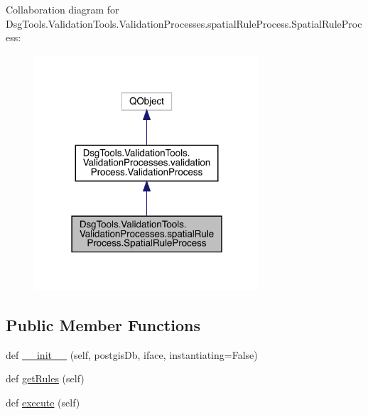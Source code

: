 Collaboration diagram for Dsg\+Tools.\+Validation\+Tools.\+Validation\+Processes.\+spatial\+Rule\+Process.\+Spatial\+Rule\+Process\+:
\nopagebreak
\begin{figure}[H]
\begin{center}
\leavevmode
\includegraphics[width=238pt]{class_dsg_tools_1_1_validation_tools_1_1_validation_processes_1_1spatial_rule_process_1_1_spatial_rule_process__coll__graph}
\end{center}
\end{figure}
\subsection*{Public Member Functions}
\begin{DoxyCompactItemize}
\item 
def \mbox{\hyperlink{class_dsg_tools_1_1_validation_tools_1_1_validation_processes_1_1spatial_rule_process_1_1_spatial_rule_process_a72c86a634d8fbd1309d938c424d384cb}{\+\_\+\+\_\+init\+\_\+\+\_\+}} (self, postgis\+Db, iface, instantiating=False)
\item 
def \mbox{\hyperlink{class_dsg_tools_1_1_validation_tools_1_1_validation_processes_1_1spatial_rule_process_1_1_spatial_rule_process_a21613a30ab73453e3d72c0553ac1f2d6}{get\+Rules}} (self)
\item 
def \mbox{\hyperlink{class_dsg_tools_1_1_validation_tools_1_1_validation_processes_1_1spatial_rule_process_1_1_spatial_rule_process_a766c38896529e992ec430782935ff72b}{execute}} (self)
\end{DoxyCompactItemize}
